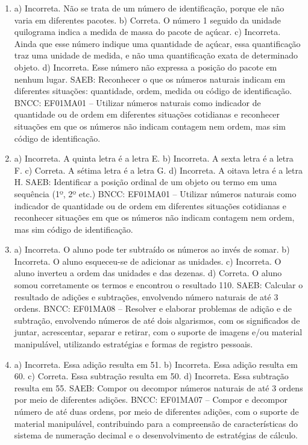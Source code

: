 \begin{enumerate}
\item
a) Incorreta. Não se trata de um número de identificação, porque ele não varia em diferentes pacotes.
b) Correta. O número 1 seguido da unidade quilograma indica a medida de
massa do pacote de açúcar.
c) Incorreta. Ainda que esse número indique uma quantidade de açúcar,
essa quantificação traz uma unidade de medida, e não uma
quantificação exata de determinado objeto.
d) Incorreta. Esse número não expressa a posição do pacote em nenhum
lugar.
SAEB: Reconhecer o que os números naturais indicam em diferentes
situações: quantidade, ordem, medida ou código de identificação.
BNCC: EF01MA01 -- Utilizar números naturais como indicador de quantidade
ou de ordem em diferentes situações cotidianas e reconhecer situações em
que os números não indicam contagem nem ordem, mas sim código de
identificação.

\item
a) Incorreta. A quinta letra é a letra E.
b) Incorreta. A sexta letra é a letra F.
c) Correta. A sétima letra é a letra G.
d) Incorreta. A oitava letra é a letra H.
SAEB: Identificar a posição ordinal de um objeto ou termo em uma
sequência (1º, 2º etc.)
BNCC: EF01MA01 -- Utilizar números naturais como indicador de quantidade
ou de ordem em diferentes situações cotidianas e reconhecer situações em
que os números não indicam contagem nem ordem, mas sim código de
identificação.

\item
a) Incorreta. O aluno pode ter subtraído os números ao invés de
somar.
b) Incorreta. O aluno esqueceu-se de adicionar as unidades.
c) Incorreta. O aluno inverteu a ordem das unidades e das dezenas.
d) Correta. O aluno somou corretamente os termos e encontrou o resultado 110.
SAEB: Calcular o resultado de adições e subtrações, envolvendo
número naturais de até 3 ordens.
BNCC: EF01MA08 -- Resolver e elaborar problemas de adição e de subtração,
envolvendo números de até dois algarismos, com os significados de
juntar, acrescentar, separar e retirar, com o suporte de imagens e/ou
material manipulável, utilizando estratégias e formas de registro
pessoais.

\item
a) Incorreta. Essa adição resulta em 51.
b) Incorreta. Essa adição resulta em 60.
c) Correta. Essa subtração resulta em 50.
d) Incorreta. Essa subtração resulta em 55.
SAEB: Compor ou decompor números naturais de até 3 ordens por
meio de diferentes adições.
BNCC: EF01MA07 -- Compor e decompor número de até duas ordens, por meio
de diferentes adições, com o suporte de material manipulável,
contribuindo para a compreensão de características do sistema de
numeração decimal e o desenvolvimento de estratégias de cálculo.


\end{enumerate}

